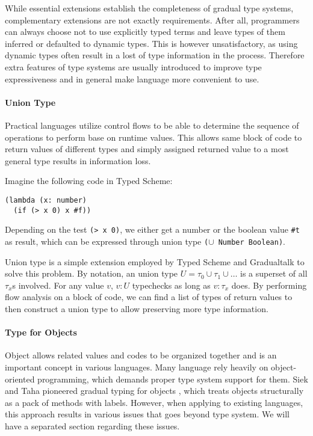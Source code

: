 While essential extensions establish the completeness of gradual type systems,
complementary extensions are not exactly requirements.
After all, programmers can always choose not to use explicitly typed terms and
leave types of them inferred or defaulted to dynamic types.
This is however unsatisfactory, as using dynamic types often result in a lost of type information in the process.
Therefore extra features of type systems are usually introduced to improve type expressiveness and
in general make language more convenient to use.

\paragraph{Union Type}

Practical languages utilize control flows to be able to determine
the sequence of operations to perform base on runtime values.
This allows same block of code to return values of different types and simply
assigned returned value to a most general type results in information loss.

Imagine the following code in Typed Scheme:

\begin{verbatim}
(lambda (x: number)
  (if (> x 0) x #f))
\end{verbatim}

Depending on the test \texttt{(> x 0)}, we either get a number or the boolean value \texttt{\#t} as result,
which can be expressed through union type \texttt{($\cup$ Number Boolean)}.

Union type is a simple extension employed by Typed Scheme and Gradualtalk
to solve this problem.
By notation, an union type $U = \tau_0 \cup \tau_1 \cup \ldots$ is a superset of
all $\tau_x$s involved. For any value $v$, $v : U$ typechecks as long as $v : \tau_x$ does.
By performing flow analysis on a block of code, we can find a list of types of return values to
then construct a union type to allow preserving more type information.

\paragraph{Type for Objects}

Object allows related values and codes to be organized together and is an important concept
in various languages. Many language rely heavily on object-oriented programming,
which demands proper type system support for them.
Siek and Taha pioneered gradual typing for objects \cite{siek2007gradual}, which
treats objects structurally as a pack of methods with labels.
However, when applying to existing languages,
this approach results in various issues that goes beyond type system.
We will have a separated section regarding these issues.

